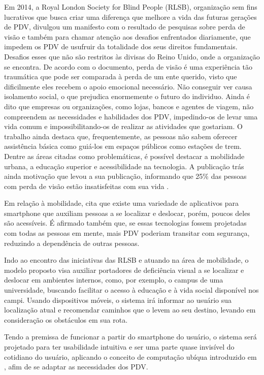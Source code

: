 \documentclass[english,brazilian]{UNISINOSmonografia}
\begin{document}
Em 2014, a Royal London Society for Blind People (RLSB), organização sem fins lucrativos que busca criar uma diferença que melhore a vida das futuras gerações de PDV, divulgou um manifesto com o resultado de pesquisas sobre perda de visão e também para chamar atenção aos desafios enfrentados diariamente, que impedem os PDV de usufruir da totalidade dos seus direitos fundamentais. Desafios esses que não são restritos às divisas do Reino Unido, onde a organização se encontra.
De acordo com o documento, perda de visão é uma experiência tão traumática que pode ser comparada à perda de um ente querido, visto que dificilmente eles recebem o apoio emocional necessário. Não conseguir ver causa isolamento social, o que prejudica enormemente o futuro do individuo. Ainda é dito que empresas ou organizações, como lojas, bancos e agentes de viagem, não compreendem as necessidades e habilidades dos PDV, impedindo-os de levar uma vida comum e impossibilitando-os de realizar as atividades que gostariam. O trabalho ainda destaca que, frequentemente, as pessoas não sabem oferecer assistência básica como guiá-los em espaços públicos como estações de trem. Dentre as áreas citadas como problemáticas, é possível destacar a mobilidade urbana, a educação superior e acessibilidade na tecnologia. A publicação trás ainda motivação que levou a sua publicação, informando que 25\% das pessoas com perda de visão estão insatisfeitas com sua vida \cite{YouthManifesto}.

Em relação à mobilidade,  cita que existe uma variedade de aplicativos para smartphone que auxiliam pessoas a se localizar e deslocar, porém, poucos deles são acessíveis. É afirmado também que, se essas tecnologias fossem projetadas com todas as pessoas em mente, mais PDV poderiam transitar com segurança, reduzindo a dependência de outras pessoas. 

Indo ao encontro das iniciativas das RLSB e atuando na área de mobilidade, o modelo proposto visa auxiliar portadores de deficiência visual a se localizar e deslocar em ambientes internos, como, por exemplo, o campus de uma universidade, buscando facilitar o acesso à educação e à vida social disponível nos campi. Usando dispositivos móveis, o sistema irá informar ao usuário sua localização atual e recomendar caminhos que o levem ao seu destino, levando em consideração os obstáculos em sua rota.

Tendo a premissa de funcionar a partir do smartphone do usuário, o sistema será projetado para ter usabilidade intuitiva e ser uma parte quase invisível do cotidiano do usuário, aplicando o conceito de computação ubíqua introduzido em , afim de se adaptar as necessidades dos PDV.
\end{document}
